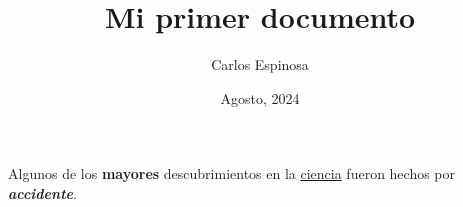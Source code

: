 \documentclass[12pt, letterpaper, twoside]{article}
\title{Mi primer documento}
\author{Carlos Espinosa}
\date{Agosto, 2024}
\begin{document}
 
\maketitle
 
Algunos de los \textbf{mayores}
descubrimientos en la \underline{ciencia} 
fueron hechos por \textbf{\textit{accidente}}.
\end{document}
